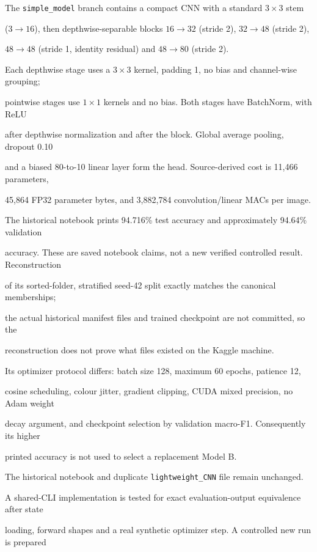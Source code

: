 \documentclass[11pt,a4paper]{article}
\DeclareRobustCommand{\code}[1]{\nolinkurl{#1}}
\begin{document}
The \code{simple_model} branch contains a compact CNN with a standard $3\times3$ stem

($3\to16$), then depthwise-separable blocks $16\to32$ (stride 2), $32\to48$ (stride 2),

$48\to48$ (stride 1, identity residual) and $48\to80$ (stride 2).

Each depthwise stage uses a $3\times3$ kernel, padding 1, no bias and channel-wise grouping;

pointwise stages use $1\times1$ kernels and no bias. Both stages have BatchNorm, with ReLU

after depthwise normalization and after the block. Global average pooling, dropout 0.10

and a biased 80-to-10 linear layer form the head. Source-derived cost is 11,466 parameters,

45,864 FP32 parameter bytes, and 3,882,784 convolution/linear MACs per image.



The historical notebook prints 94.716\% test accuracy and approximately 94.64\% validation

accuracy. These are saved notebook claims, not a new verified controlled result. Reconstruction

of its sorted-folder, stratified seed-42 split exactly matches the canonical memberships;

the actual historical manifest files and trained checkpoint are not committed, so the

reconstruction does not prove what files existed on the Kaggle machine.

Its optimizer protocol differs: batch size 128, maximum 60 epochs, patience 12,

cosine scheduling, colour jitter, gradient clipping, CUDA mixed precision, no Adam weight

decay argument, and checkpoint selection by validation macro-F1. Consequently its higher

printed accuracy is not used to select a replacement Model B.



The historical notebook and duplicate \code{lightweight_CNN} file remain unchanged.

A shared-CLI implementation is tested for exact evaluation-output equivalence after state

loading, forward shapes and a real synthetic optimizer step. A controlled new run is prepared
\end{document}
